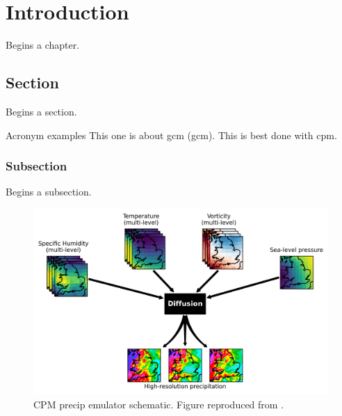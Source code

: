 \let\textcircled=\pgftextcircled
\chapter{Introduction}
\label{chap:intro}

Begins a chapter.

\section{Section}
\label{sec:sec01}

Begins a section.

Acronym examples This one is about \acrlong{gcm} (\acrshort{gcm}). This is best done with \acrfull{cpm}.

\subsection{Subsection}
\label{subsec:subsec01}

Begins a subsection.

\begin{figure}[t!]
	\centering
	\includegraphics[height=0.35\textheight]{chapters/figures/1_intro/ai-schematic.png}
	\caption{CPM precip emulator schematic. Figure reproduced from \cite{Addison2024diffcpmprecipemul}.}
	\label{fig:example}
\end{figure}
